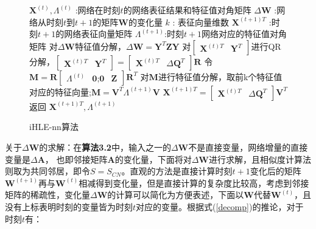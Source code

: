 \begin{figure}[htb]
	\centering
	\begin{minipage}{.7\linewidth}
		\begin{algorithm}[H]\label{iHLE_nn}
			\small
			\caption{iHLE-nn算法}
			\begin{algorithmic}[1]
				\Require
				\Statex $\textbf{X} ^{(t)},\Lambda^{(t)}$ :网络在时刻$t$的网络表征结果和特征值对角矩阵
				\Statex $\Delta\textbf{W}$ :网络从时刻$t$到$t+1$的矩阵$\textbf{W}$的变化量
				\Statex $k$ : 表征向量维数
				\Ensure
				\Statex $\textbf{X}^{(t+1)T}$ :时刻$t+1$的网络表征向量矩阵
				\Statex $\Lambda^{(t+1)}$:时刻$t+1$网络对应的特征值对角矩阵
				\Statex
				\State 对$\Delta\textbf{W}$特征值分解，$\Delta\textbf{W} =  \textbf{Y}^{T} \textbf{Z}  \textbf{Y}$
				\State 对$\begin{bmatrix} \textbf{X}^{(t)T} & \textbf{Y}^{T}\end{bmatrix}$进行QR分解，$\begin{bmatrix} \textbf{X}^{(t)T} & \textbf{Y}^{T}\end{bmatrix} = \begin{bmatrix} \textbf{X}^{(t)T} & \Delta\textbf{Q}^{T} \end{bmatrix} \textbf{R}$
				\State 令$\textbf{M} = \textbf{R}\begin{bmatrix}  \Lambda^{(t)} & \textbf{0};
				\textbf{0} & \textbf{Z} \end{bmatrix}
				\textbf{R}^T$
				\State 对$\textbf{M}$进行特征值分解，取前k个特征值对应的特征向量;$\textbf{M} =\textbf{V}^T \Lambda^{(t+1)} \textbf{V}$
				\State $\textbf{X}^{(t+1)T} = \begin{bmatrix} \textbf{X}^{(t)T} & \Delta\textbf{Q}^{T} \end{bmatrix} \textbf{V}^T$
				\State 返回 $\textbf{X}^{(t+1)T}, \Lambda^{(t+1)}$
			\end{algorithmic}
		\end{algorithm}
	\end{minipage}
\end{figure}


\problem 关于$\Delta\textbf{W}$的求解：在\textbf{算法3.2}中，输入之一的$\Delta\textbf{W}$不是直接变量，网络增量的直接变量是$\Delta\textbf{A}$， 也即邻接矩阵$\textbf{A}$的变化量，下面将对$\Delta\textbf{W}$进行求解，且相似度计算法则取为共同邻居，即令$S=S_{CN}$。直观的方法是直接计算时刻$t+1$变化后的矩阵$\textbf{W}^{(t+1)}$再与$\textbf{W}^{(t)}$相减得到变化量，但是直接计算的复杂度比较高，考虑到邻接矩阵的稀疏性，变化量$\Delta\textbf{W}$的计算可以简化为方便表述，下面以$\textbf{W}$代替$\textbf{W}^{(t)}$，且没有上标表明时刻的变量皆为时刻$t$对应的变量。根据式(\ref{decomp})的推论，对于时刻$t$有：

